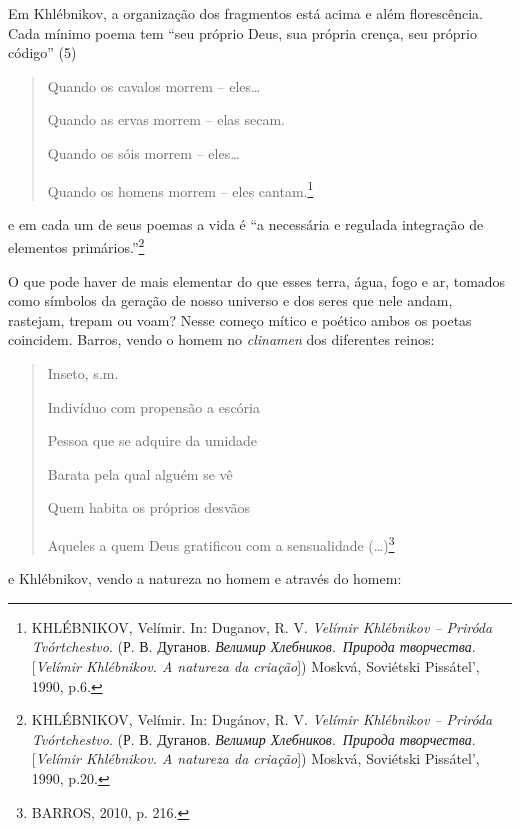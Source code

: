 Em Khlébnikov, a organização dos fragmentos está acima e além
florescência. Cada mínimo poema tem ``seu próprio Deus, sua própria
crença, seu próprio código'' (5)

\begin{quote}
Quando os cavalos morrem -- eles\ldots{}

Quando as ervas morrem -- elas secam.

Quando os sóis morrem -- eles\ldots{}

Quando os homens morrem -- eles cantam.\footnote{KHLÉBNIKOV, Velímir.
  In: Duganov, R. V. \emph{Velímir Khlébnikov -- Priróda Tvórtchestvo}.
  (Р. В. Дуганов. \emph{Велимир Хлебников}.~\emph{Природа творчества}.
  {[}\emph{Velímir Khlébnikov. A natureza da criação}{]}) Moskvá,
  Soviétski Pissátel', 1990, p.6.}
\end{quote}

e em cada um de seus poemas a vida é ``a necessária e regulada
integração de elementos primários.''\footnote{KHLÉBNIKOV, Velímir. In:
  Dugánov, R. V. \emph{Velímir Khlébnikov -- Priróda Tvórtchestvo}. (Р.
  В. Дуганов. \emph{Велимир Хлебников}.~\emph{Природа творчества}.
  {[}\emph{Velímir Khlébnikov. A natureza da criação}{]}) Moskvá,
  Soviétski Pissátel', 1990, p.20.}

O que pode haver de mais elementar do que esses terra, água, fogo e ar,
tomados como símbolos da geração de nosso universo e dos seres que nele
andam, rastejam, trepam ou voam? Nesse começo mítico e poético ambos os
poetas coincidem. Barros, vendo o homem no \emph{clinamen} dos
diferentes reinos:

\begin{quote}
Inseto, s.m.

Indivíduo com propensão a escória

Pessoa que se adquire da umidade

Barata pela qual alguém se vê

Quem habita os próprios desvãos

Aqueles a quem Deus gratificou com a sensualidade (\ldots{})\footnote{BARROS,
  2010, p. 216.}
\end{quote}

e Khlébnikov, vendo a natureza no homem e através do homem:

